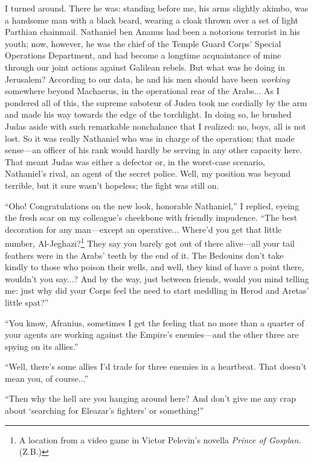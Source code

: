 I turned around. There he was: standing before me, his arms slightly akimbo, was a handsome man with a black beard, wearing a cloak thrown over a set of light Parthian chainmail. Nathaniel ben Ananus had been a notorious terrorist in his youth; now, however, he was the chief of the Temple Guard Corps' Special Operations Department, and had become a longtime acquaintance of mine through our joint actions against Galilean rebels. But what was he doing in Jerusalem? According to our data, he and his men should have been \emph{working} somewhere beyond Machaerus, in the operational rear of the Arabs... As I pondered all of this, the supreme saboteur of Judea took me cordially by the arm and made his way towards the edge of the torchlight. In doing so, he brushed Judas aside with such remarkable nonchalance that I realized: no, boys, all is not lost. So it was really Nathaniel who was in charge of the operation; that made sense---an officer of his rank would hardly be serving in any other capacity here. That meant Judas was either a defector or, in the worst-case scenario, Nathaniel's rival, an agent of the secret police. Well, my position was beyond terrible, but it sure wasn't hopeless; the fight was still on.

``Oho! Congratulations on the new look, honorable Nathaniel,'' I replied, eyeing the fresh scar on my colleague's cheekbone with friendly impudence. ``The best decoration for any man---except an operative... Where'd you get that little number, Al-Jeghazi?\footnote{A location from a video game in Victor Pelevin's novella \emph{Prince of Gosplan}. (Z.B.)} They say you barely got out of there alive---all your tail feathers were in the Arabs' teeth by the end of it. The Bedouins don't take kindly to those who poison their wells, and well, they kind of have a point there, wouldn't you say...? And by the way, just between friends, would you mind telling me: just why did your Corps feel the need to start meddling in Herod and Aretas' little spat?''

``You know, Afranius, sometimes I get the feeling that no more than a quarter of your agents are working against the Empire's enemies---and the other three are spying on its allies.''

``Well, there's some allies I'd trade for three enemies in a heartbeat. That doesn't mean you, of course...''

``Then why the hell are you hanging around here? And don't give me any crap about `searching for Eleazar's fighters' or something!''

